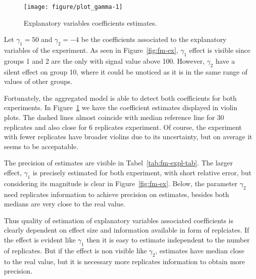 \begin{figure}[t]
  \centering
\begin{knitrout}
\color{fgcolor}
\texttt{[image: figure/plot\_gamma-1]} 

\end{knitrout}
  \caption{Explanatory variables coefficients estimates.}
  \label{fig:fm-gamma}
\end{figure}

Let $\gamma_1=50$ and $\gamma_2=-4$ be the coefficients associated to the explanatory variables of the experiment. As seen in Figure~\ref{fig:fm-ex}, $\gamma_1$ effect is visible since groups 1 and 2 are the only with signal value above 100. However, $\gamma_2$ have a silent effect on group 10, where it could be unoticed as it is in the same range of values of other groups.


Fortunately, the aggregated model is able to detect both coefficients for both experiments. In Figure~\ref{fig:fm-gamma} we have the coefficient estimates displayed in violin plots. The dashed lines almost coincide with median reference line for 30 replicates and also close for 6 replicates experiment. Of course, the experiment with fewer replicates have broader violins due to its uncertainty, but on average it seems to be accepatable.


The precision of estimates are visible in Tabel~\ref{tab:fm-expl-tab}. The larger effect, $\gamma_1$ is precisely estimated for both experiment, with short relative error, but considering its magnitude is clear in Figure~\ref{fig:fm-ex}. Below, the parameter $\gamma_2$ need replicates information to achieve precision on estimates, besides both medians are very close to the real value. 

Thus quality of estimation of explanatory variables associated coefficients is clearly dependent on effect size and information available in form of replciates. If the effect is evident like $\gamma_1$ then it is easy to estimate independent to the number of replicates. But if the effect is non visible like $\gamma_2$, estimates have median close to the real value, but it is necessary more replicates information to obtain more precision.


